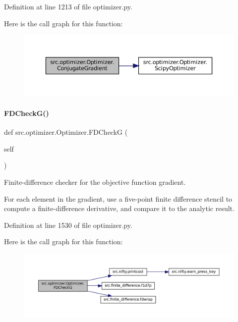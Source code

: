 Definition at line 1213 of file optimizer.\+py.

Here is the call graph for this function\+:
\nopagebreak
\begin{figure}[H]
\begin{center}
\leavevmode
\includegraphics[width=350pt]{classsrc_1_1optimizer_1_1Optimizer_a6b8bc81ae670b40040d07ae09ccdb7a2_cgraph}
\end{center}
\end{figure}
\mbox{\label{classsrc_1_1optimizer_1_1Optimizer_aca89ff4f0813ce420ea0dcaab14c22d9}} 
\paragraph{\texorpdfstring{F\+D\+Check\+G()}{FDCheckG()}}
{\footnotesize\ttfamily def src.\+optimizer.\+Optimizer.\+F\+D\+CheckG (\begin{DoxyParamCaption}\item[{}]{self }\end{DoxyParamCaption})}



Finite-\/difference checker for the objective function gradient. 

For each element in the gradient, use a five-\/point finite difference stencil to compute a finite-\/difference derivative, and compare it to the analytic result. 

Definition at line 1530 of file optimizer.\+py.

Here is the call graph for this function\+:
\nopagebreak
\begin{figure}[H]
\begin{center}
\leavevmode
\includegraphics[width=350pt]{classsrc_1_1optimizer_1_1Optimizer_aca89ff4f0813ce420ea0dcaab14c22d9_cgraph}
\end{center}
\end{figure}
\mbox{\label{classsrc_1_1optimizer_1_1Optimizer_a9e68121016fa389cc2517d05e4286a6e}} 
